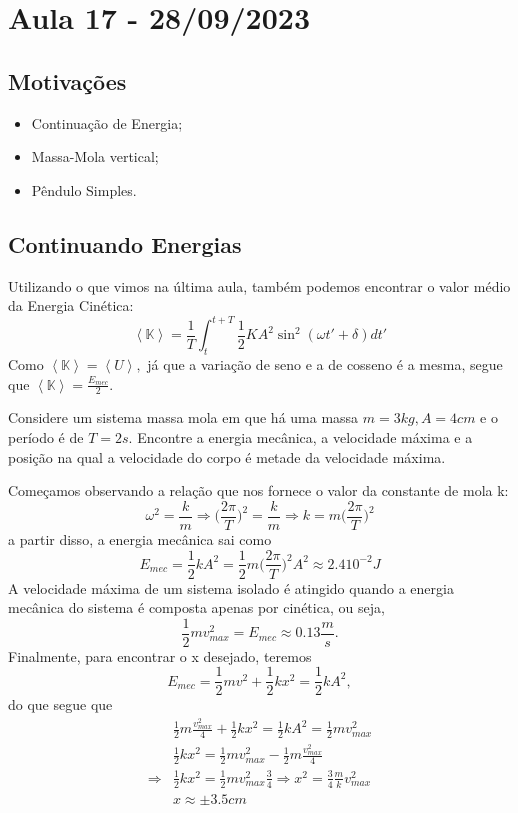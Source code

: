 \documentclass[physicsII_notes.tex]{subfiles}
\begin{document}
\section{Aula 17 - 28/09/2023}
\subsection{Motivações}
\begin{itemize}
	\item Continuação de Energia;
	\item Massa-Mola vertical;
	\item Pêndulo Simples.
\end{itemize}
\subsection{Continuando Energias}
Utilizando o que vimos na última aula, também podemos encontrar o valor médio da Energia Cinética:
\[
	\left< \mathbb{K} \right> = \frac{1}{T}\int_{t}^{t+T}\frac{1}{2}KA^{2}\sin^{2}{(\omega t'+\delta )}dt'
\]
Como \(\left< \mathbb{K} \right> = \left< U \right>,\) já que a variação de seno e a de cosseno é a mesma, segue que \(\left< \mathbb{K} \right> = \frac{E_{mec}}{2}\).
\begin{example}
	Considere um sistema massa mola em que há uma massa \(m=3kg, A = 4cm\) e o período é de \(T=2s\). Encontre a energia mecânica, a velocidade máxima e a posição na qual
	a velocidade do corpo é metade da velocidade máxima.

	Começamos observando a relação que nos fornece o valor da constante de mola k:
	\[
		\omega ^{2} = \frac{k}{m} \Rightarrow \biggl(\frac{2\pi }{T}\biggr)^{2} = \frac{k}{m} \Rightarrow k = m \biggl(\frac{2\pi }{T}\biggr)^{2}
	\]
	a partir disso, a energia mecânica sai como
	\[
		E_{mec} = \frac{1}{2}kA^{2} = \frac{1}{2}m \biggl(\frac{2\pi }{T}\biggr)^{2}A^{2}\approx 2.4 10^{-2}J
	\]
	A velocidade máxima de um sistema isolado é atingido quando a energia mecânica do sistema é composta apenas por cinética, ou seja,
	\[
		\frac{1}{2}mv_{max}^{2} = E_{mec}\approx 0.13\frac{m}{s}.
	\]
	Finalmente, para encontrar o x desejado, teremos
	\[
		E_{mec} = \frac{1}{2}mv^{2} + \frac{1}{2}kx^{2} = \frac{1}{2}kA^{2},
	\]
	do que segue que
	\begin{align*}
		            & \frac{1}{2}m \frac{v_{max}^{2}}{4} + \frac{1}{2}kx^{2} = \frac{1}{2} kA^{2} = \frac{1}{2}mv_{max}^{2}        \\
		            & \frac{1}{2}kx^{2}=\frac{1}{2}mv_{max}^{2}-\frac{1}{2}m \frac{v_{max}^{2}}{4}                                 \\
		\Rightarrow & \frac{1}{2}kx^{2} = \frac{1}{2}mv_{max}^{2}\frac{3}{4} \Rightarrow x^{2} = \frac{3}{4}\frac{m}{k}v_{max}^{2} \\
		            & x\approx\pm 3.5cm
	\end{align*}
\end{example}
\end{document}
